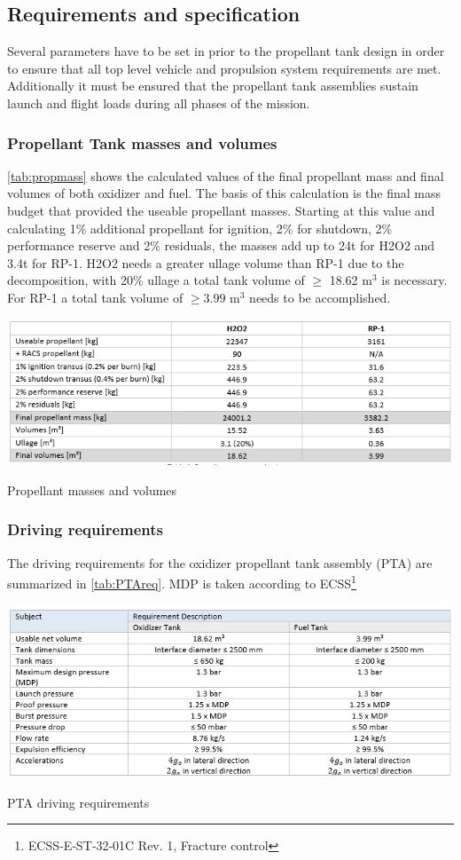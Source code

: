 \subsection{Requirements and specification}
Several parameters have to be set in prior to the propellant tank design in order to ensure that all top level vehicle and propulsion system requirements are met. Additionally it must be ensured that the propellant tank assemblies sustain launch and flight loads during all phases of the mission.
\subsubsection{Propellant Tank masses and volumes}

\autoref{tab:propmass} shows the calculated values of the final propellant mass and final volumes of both oxidizer and fuel. The basis of this calculation is the final mass budget that provided the useable propellant masses. Starting at this value and calculating 1\% additional propellant for ignition, 2\% for shutdown, 2\% performance reserve and 2\% residuals, the masses add up to 24t for H2O2 and 3.4t for RP-1. H2O2 needs a greater ullage volume than RP-1 due to the decomposition, with 20\% ullage a total tank volume of $\geq$ 18.62 m$^3$ is necessary. For RP-1 a total tank volume of  $\geq3.99$ m$^3$ needs to be accomplished.
\begin{table}[H]
    \centering
    \includegraphics[width = \linewidth]{propmassvol}
    \caption{Propellant masses and volumes}
    \label{tab:propmass}
\end{table}{}
\subsubsection{Driving requirements}
The driving requirements for the oxidizer propellant tank assembly (PTA) are summarized in \autoref{tab:PTAreq}. MDP is taken according to ECSS\footnote{ECSS‐E‐ST‐32‐01C Rev. 1, Fracture control}
\begin{table}[H]
    \centering
    \includegraphics[width = \linewidth]{ptareq}
    \caption{PTA driving requirements}
    \label{tab:PTAreq}
\end{table}{}\pagebreak
